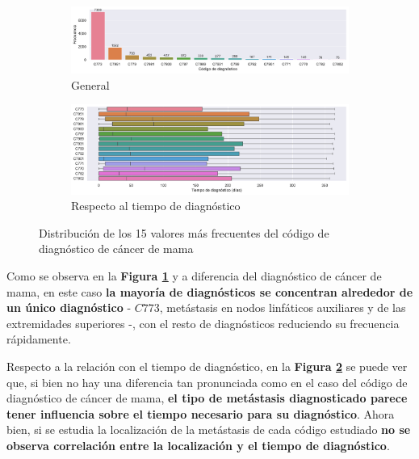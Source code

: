 \begin{itemize}[leftmargin=*]
	\begin{figure}[h]
		\begin{center}
			\begin{subfigure}{\linewidth}
				\begin{center}
					\includegraphics[width=\linewidth]{figs/chapter3/categorical/mcdistribution}
					\caption{General}\label{fig:ch3mcdist}
				\end{center}
			\end{subfigure} 
			\begin{subfigure}{\linewidth}
				\begin{center}
					\includegraphics[width=\linewidth]{figs/chapter3/categorical/mcperiod}
					\caption{Respecto al tiempo de diagnóstico}\label{fig:ch3mcperiod}
				\end{center}
			\end{subfigure} 
		\end{center}
		\captionsetup{aboveskip=-5pt, belowskip=-15pt, justification=centering}
		\caption{Distribución de los 15 valores más frecuentes del código de diagnóstico de cáncer de mama}
		\label{fig:ch3mc}
	\end{figure}
	
	Como se observa en la \textbf{Figura \ref{fig:ch3mcdist}} y a diferencia del diagnóstico de cáncer de mama, en este caso \textbf{la mayoría de diagnósticos se concentran alrededor de un único diagnóstico} - $C773$, metástasis en nodos linfáticos auxiliares y de las extremidades superiores -, con el resto de diagnósticos reduciendo su frecuencia rápidamente.
	
	Respecto a la relación con el tiempo de diagnóstico, en la \textbf{Figura \ref{fig:ch3mcperiod}} se puede ver que, si bien no hay una diferencia tan pronunciada como en el caso del código de diagnóstico de cáncer de mama, \textbf{el tipo de metástasis diagnosticado parece tener influencia sobre el tiempo necesario para su diagnóstico}. Ahora bien, si se estudia la localización de la metástasis de cada código estudiado \textbf{no se observa correlación entre la localización y el tiempo de diagnóstico}.
	

\end{itemize}
